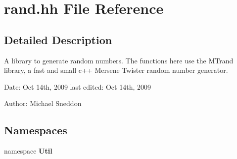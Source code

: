 \section{rand.hh File Reference}
\label{rand_8hh}


\subsection{Detailed Description}
A library to generate random numbers. The functions here use the MTrand library, a fast and small c++ Mersene Twister random number generator.

\begin{Desc}
\item[Date:]Oct 14th, 2009 last edited: Oct 14th, 2009\end{Desc}
\begin{Desc}
\item[Author:]Michael Sneddon \end{Desc}


\subsection*{Namespaces}
\begin{CompactItemize}
\item 
namespace {\bf Util}
\end{CompactItemize}

